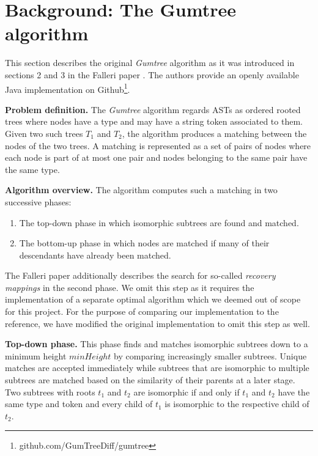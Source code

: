 \documentclass[letterpaper]{article}
\newcommand{\mypar}[1]{{\bf #1.}}
\begin{document}
\section{Background: The Gumtree algorithm}\label{sec:background}

This section describes the original \emph{Gumtree} algorithm as it was introduced in sections 2 and 3 in the Falleri paper \cite{falleri:2014:structure_diff}. The authors provide an openly available Java implementation on Github\footnote{github.com/GumTreeDiff/gumtree}.

\mypar{Problem definition}
The \emph{Gumtree} algorithm regards ASTs as ordered rooted trees where nodes have a type and may have a string token associated to them.
Given two such trees $T_1$ and $T_2$, the algorithm produces a matching between the nodes of the two trees.
A matching is represented as a set of pairs of nodes where each node is part of at most one pair and nodes belonging to the same pair have the same type.

\mypar{Algorithm overview}
The algorithm computes such a matching in two successive phases:
\begin{enumerate}
	\item The top-down phase in which isomorphic subtrees are found and matched.
	\item The bottom-up phase in which nodes are matched if many of their descendants have already been matched.
\end{enumerate}
The Falleri paper additionally describes the search for so-called \emph{recovery mappings} in the second phase.
We omit this step as it requires the implementation of a separate optimal algorithm which we deemed out of scope for this project.
For the purpose of comparing our implementation to the reference, we have modified the original implementation to omit this step as well.

\mypar{Top-down phase}
This phase finds and matches isomorphic subtrees down to a minimum height $minHeight$ by comparing increasingly smaller subtrees.
Unique matches are accepted immediately while subtrees that are isomorphic to multiple subtrees are matched based on the similarity of their parents at a later stage.
Two subtrees with roots $t_1$ and $t_2$ are isomorphic if and only if $t_1$ and $t_2$ have the same type and token and every child of $t_1$ is isomorphic to the respective child of $t_2$.
\end{document}
